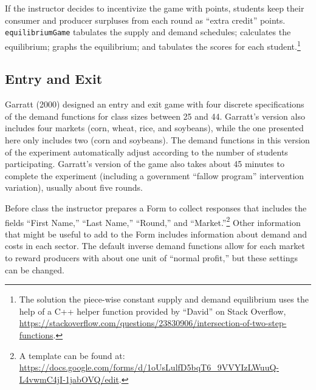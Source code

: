\documentclass[
]{article}
\begin{document}
If the instructor decides to incentivize the game with points, students
keep their consumer and producer surpluses from each round as ``extra
credit'' points. \texttt{equilibriumGame} tabulates the supply and
demand schedules; calculates the equilibrium; graphs the equilibrium;
and tabulates the scores for each student.\footnote{The solution the
  piece-wise constant supply and demand equilibrium uses the help of a
  C++ helper function provided by ``David'' on Stack Overflow,\\
  \url{https://stackoverflow.com/questions/23830906/intersection-of-two-step-functions}.}

\hypertarget{entry-and-exit}{%
\subsection{Entry and Exit}\label{entry-and-exit}}

Garratt (2000) designed an entry and exit game with four discrete
specifications of the demand functions for class sizes between 25 and
44. Garratt's version also includes four markets (corn, wheat, rice, and
soybeans), while the one presented here only includes two (corn and
soybeans). The demand functions in this version of the experiment
automatically adjust according to the number of students participating.
Garratt's version of the game also takes about 45 minutes to complete
the experiment (including a government ``fallow program'' intervention
variation), usually about five rounds.

Before class the instructor prepares a Form to collect responses that
includes the fields ``First Name,'' ``Last Name,'' ``Round,'' and
``Market.''\footnote{A template can be found at:\\
  \url{https://docs.google.com/forms/d/1oUsLulfD5bqT6_9VVYIzLWuuQ-L4vwmC4jI-1jabOVQ/edit}.}
Other information that might be useful to add to the Form includes
information about demand and costs in each sector. The default inverse
demand functions allow for each market to reward producers with about
one unit of ``normal profit,'' but these settings can be changed.
\end{document}
